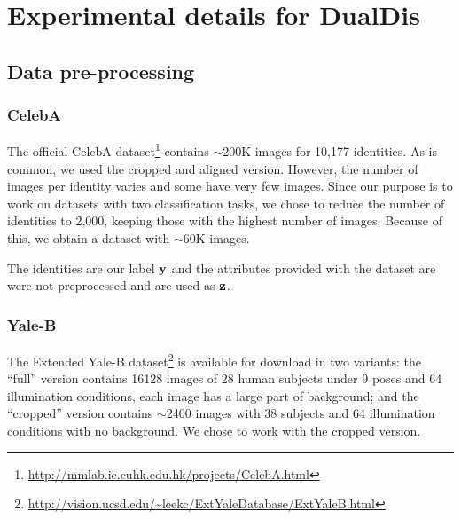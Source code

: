 \chapter{Experimental details for DualDis}
\label{chapter:dualdisA}


\minitoc
{}


\section{Data pre-processing}

\subsection{CelebA}

The official CelebA dataset\footnote{\url{http://mmlab.ie.cuhk.edu.hk/projects/CelebA.html}} contains $\sim$200K images for 10,177 identities. As is common, we used the cropped and aligned version. However, the number of images per identity varies and some have very few images. Since our purpose is to work on datasets with two classification tasks, we chose to reduce the number of identities to 2,000, keeping those with the highest number of images. Because of this, we obtain a dataset with $\sim$60K images.

The identities are our label $\mathbf{y}$ and the attributes provided with the dataset are were not preprocessed and are used as $\mathbf{z}$.

\subsection{Yale-B}

The Extended Yale-B dataset\footnote{\url{http://vision.ucsd.edu/~leekc/ExtYaleDatabase/ExtYaleB.html}} is available for download in two variants: the ``full'' version contains 16128 images of 28 human subjects under 9 poses and 64 illumination conditions, each image has a large part of background; and the ``cropped'' version contains $\sim$2400 images with 38 subjects and 64 illumination conditions with no background. We chose to work with the cropped version.

